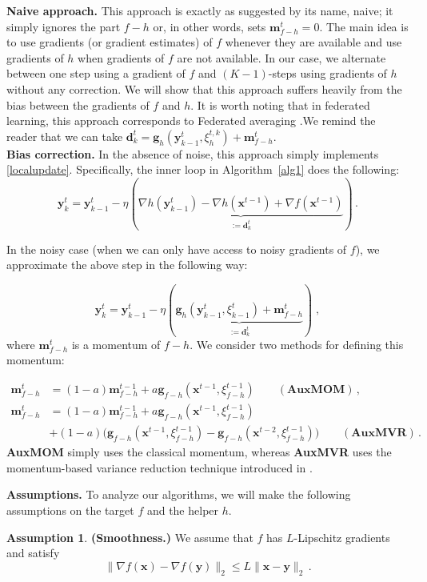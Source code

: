\documentclass[10pt]{article} %
\theoremstyle{plain}
\theoremstyle{definition}
\newtheorem{assumption}[theorem]{Assumption}
\theoremstyle{remark}
\newcommand{\norm}[1]{\|#1\|_2}
\def\vd{{\bm{d}}}
\def\vg{{\bm{g}}}
\def\vm{{\bm{m}}}
\def\vx{{\bm{x}}}
\def\vy{{\bm{y}}}
\begin{document}
\textbf{Naive approach.} This approach is exactly as suggested by its name, naive; it simply ignores the part $f-h$ or, in other words, sets $\vm^t_{f-h} = 0$. The main idea is to use gradients (or gradient estimates) of $f$ whenever they are available and use gradients of $h$ when gradients of $f$ are not available. In our case, we alternate between one step using a gradient of $f$ and $(K-1)$-steps using gradients of $h$ without any correction. We will show that this approach suffers heavily from the bias between the gradients of $f$ and $h$. It is worth noting that in federated learning, this approach corresponds to Federated averaging \citep{MacMahan2017}.We remind the reader that we can take $\vd^t_k= \vg_h(\vy^{t}_{k-1},\xi^{t,k}_h) + \vm^t_{f-h}$.\\
\textbf{Bias correction.} In the absence of noise, this approach simply implements \eqref{localupdate}. Specifically, the inner loop in Algorithm~\ref{alg1} does the following: 
$$\vy^t_k = \vy^t_{k-1} - \eta (\underbrace{\nabla h(\vy^t_{k-1}) - \nabla h(\vx^{t-1}) + \nabla f(\vx^{t-1})}_{:=\vd^t_k})\,.$$

In the noisy case (when we can only have access to noisy gradients of $f$), we approximate the above step in the following way:

$$\vy^t_k = \vy^t_{k-1} - \eta (\underbrace{\vg_h(\vy^t_{k-1},\xi^t_{k-1}) + \vm_{f-h}^t}_{:=\vd^t_k})\;,$$
where $\vm_{f-h}^t$ is a momentum of $f-h$. We consider two methods for defining this momentum:

\begin{align}
    \vm_{f-h}^t &= (1-a)\vm_{f-h}^{t-1} + a \vg_{f-h}(\vx^{t-1},\xi^{t-1}_{f-h})\qquad (\textbf{AuxMOM})\label{AuxMOM}\, ,\\
    \vm_{f-h}^t &= (1-a)\vm_{f-h}^{t-1} + a \vg_{f-h}(\vx^{t-1},\xi^{t-1}_{f-h}) \nonumber\\&+ (1-a) \big(\vg_{f-h}(\vx^{t-1},\xi^{t-1}_{f-h}) - \vg_{f-h}(\vx^{t-2},\xi^{t-1}_{f-h})\big)\qquad (\textbf{AuxMVR})\label{AuxMVR}\, .
\end{align}
\textbf{AuxMOM} simply uses the classical momentum, whereas \textbf{AuxMVR} uses the momentum-based variance reduction technique introduced in \citep{MVR}.

\noindent\textbf{Assumptions.} To analyze our algorithms, we will make the following assumptions on the target $f$ and the helper $h$.

\begin{assumption}\label{A1}
\textbf{(Smoothness.)} We assume that $f$ has $L$-Lipschitz gradients and satisfy
    \begin{equation*}\label{eqn:smoothness}
        \norm{\nabla f(\vx) - \nabla f(\vy)} \leq L \norm{\vx - \vy}\,.
    \end{equation*}
\end{assumption}
\end{document}
